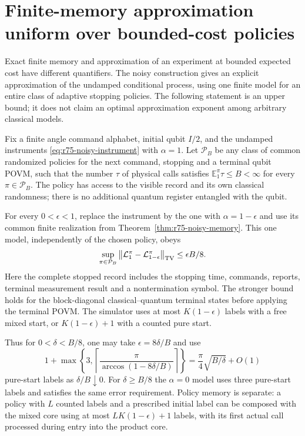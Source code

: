 \section{Finite-memory approximation uniform over bounded-cost policies}
\label{sec:r75-stopped-approximation}

Exact finite memory and approximation of an experiment at bounded
expected cost have different quantifiers.  The noisy construction gives
an explicit approximation of the undamped conditional process, using one
finite model for an entire class of adaptive stopping policies.  The
following statement is an upper bound; it does not claim an optimal
approximation exponent among arbitrary classical models.

\begin{theorem}
\label{thm:r75-stopped-approximation}
Fix a finite angle command alphabet, initial qubit $I/2$, and the
undamped instruments \eqref{eq:r75-noisy-instrument} with $\alpha=1$.
Let $\mathcal P_B$ be any class of common randomized policies for the
next command, stopping and a terminal qubit POVM, such that the number
$\tau$ of physical calls satisfies
$\mathbb E_{1}^{\pi}\tau\le B<\infty$ for every $\pi\in\mathcal P_B$.
The policy has access to the visible record and its own classical
randomness; there is no additional quantum register entangled with the
qubit.

For every $0<\epsilon<1$, replace the instrument by the one with
$\alpha=1-\epsilon$ and use its common finite realization from
Theorem~\ref{thm:r75-noisy-memory}.  This one model, independently of the
chosen policy, obeys
\begin{equation}\label{eq:r75-stopped-tv}
 \sup_{\pi\in\mathcal P_B}
 \left\|\mathcal L_1^\pi-\mathcal L_{1-\epsilon}^\pi\right\|_{\rm TV}
 \le \epsilon B/8.
\end{equation}
Here the complete stopped record includes the stopping time, commands,
reports, terminal measurement result and a nontermination symbol.  The
stronger bound holds for the block-diagonal classical--quantum terminal
states before applying the terminal POVM.  The simulator uses at most
$K(1-\epsilon)$ labels with a free mixed start, or
$K(1-\epsilon)+1$ with a counted pure start.

Thus for $0<\delta<B/8$, one may take $\epsilon=8\delta/B$ and use
\begin{equation}\label{eq:r75-approx-count}
 1+\max\left\{3,
       \left\lceil\frac\pi{\arccos(1-8\delta/B)}\right\rceil\right\}
   =\frac\pi4\sqrt{B/\delta}+O(1)
\end{equation}
pure-start labels as $\delta/B\downarrow0$.  For $\delta\ge B/8$ the
$\alpha=0$ model uses three pure-start labels and satisfies the same
error requirement.  Policy memory is separate: a policy with $L$
counted labels and a prescribed initial label can be composed with the
mixed core using at most $LK(1-\epsilon)+1$ labels, with its first actual
call processed during entry into the product core.
\end{theorem}
